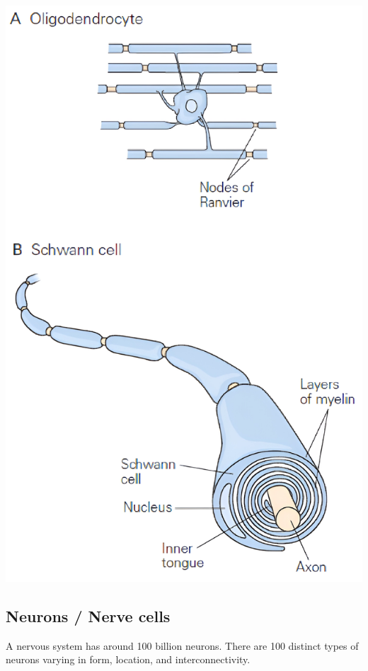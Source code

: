 \begin{minipage}{0.2\textwidth}
    \centering
    \includegraphics[width=\textwidth]{./img/insulation.png}
\end{minipage}



\subsection{Neurons / Nerve cells}

A nervous system has around 100 billion neurons.
There are 100 distinct types of neurons varying in form, location, and interconnectivity.

